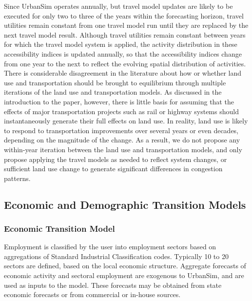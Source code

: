 \documentclass[fleqn]{article}
\begin{document}
Since UrbanSim operates annually, but travel model updates are
likely to be executed for only two to three of the years within the
forecasting horizon, travel utilities remain constant from one
travel model run until they are replaced by the next travel model
result. Although travel utilities remain constant between years
for which the travel model system is applied, the activity
distribution in these accessibility indices is updated annually,
so that the accessibility indices change from one year to the next
to reflect the evolving spatial distribution of activities.  There
is considerable disagreement in the literature about how or
whether land use and transportation should be brought to
equilibrium through multiple iterations of the land use and
transportation models.  As discussed in the introduction to the
paper, however, there is little basis for assuming that the
effects of major transportation projects such as rail or highway
systems should instantaneously generate their full effects on land
use.  In reality, land use is likely to respond to transportation
improvements over several years or even decades, depending on the
magnitude of the change.  As a result, we do not propose any
within-year iteration between the land use and transportation
models, and only propose applying the travel models as needed to
reflect system changes, or sufficient land use change to generate
significant differences in congestion patterns.

\subsection{Economic and Demographic Transition Models}
\subsubsection{Economic Transition Model}
\label{economic-transition-model}

Employment is classified by the user into employment sectors based
on aggregations of Standard Industrial Classification codes.
Typically 10 to 20 sectors are defined, based on the local economic
structure. Aggregate forecasts of economic activity and sectoral
employment are exogenous to UrbanSim, and are used as inputs to
the model. These forecasts may be obtained from state economic
forecasts or from commercial or in-house sources.
\end{document}
